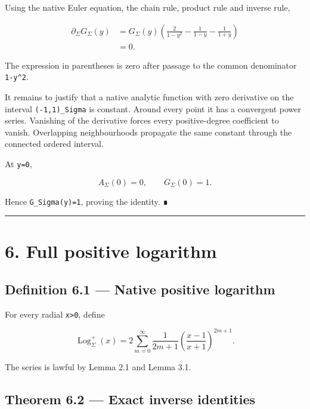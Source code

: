 Using the native Euler equation, the chain rule, product rule and inverse rule,

\[
\begin{aligned}
\partial_\Sigma G_\Sigma(y)
&=
G_\Sigma(y)
\left(
\frac{2}{1-y^2}
-
\frac{1}{1-y}
-
\frac{1}{1+y}
\right)\\
&=0.
\end{aligned}
\]

The expression in parentheses is zero after passage to the common denominator
\texttt{1-y\^{}2}.

It remains to justify that a native analytic function with zero derivative on
the interval \texttt{(-1,1)\_Sigma} is constant. Around every point it has a convergent
power series. Vanishing of the derivative forces every positive-degree
coefficient to vanish. Overlapping neighbourhoods propagate the same constant
through the connected ordered interval.

At \texttt{y=0},

\[
A_\Sigma(0)=0,
\qquad
G_\Sigma(0)=1.
\]

Hence \texttt{G\_Sigma(y)=1}, proving the identity. ∎

\begin{center}\rule{0.5\linewidth}{0.5pt}\end{center}

\hypertarget{full-positive-logarithm}{%
\section{6. Full positive logarithm}\label{full-positive-logarithm}}

\hypertarget{definition-6.1-native-positive-logarithm}{%
\subsection{Definition 6.1 --- Native positive logarithm}\label{definition-6.1-native-positive-logarithm}}

For every radial \texttt{x\textgreater{}0}, define

\[
\boxed{
\operatorname{Log}_\Sigma^+(x)
=
2\sum_{m=0}^{\infty}
\frac{1}{2m+1}
\left(
\frac{x-1}{x+1}
\right)^{2m+1}.
}
\]

The series is lawful by Lemma 2.1 and Lemma 3.1.

\hypertarget{theorem-6.2-exact-inverse-identities}{%
\subsection{Theorem 6.2 --- Exact inverse identities}\label{theorem-6.2-exact-inverse-identities}}

